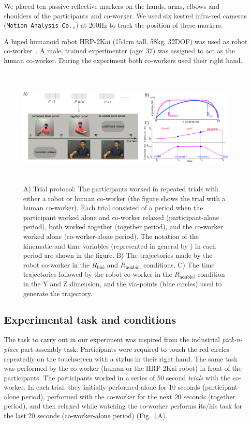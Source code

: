 We placed ten passive reflective markers on the hands, arms, elbows and shoulders of the participants and co-worker. We used six kestrel infra-red cameras (\texttt{Motion Analysis Co.,}) at 200Hz to track the position of these markers.

A biped humanoid robot HRP-2Kai (154cm tall, 58kg, 32DOF) was used as robot co-worker~\cite{Kaneko:RAS_ICHR:2015}. A male, trained experimenter (age: 37) was assigned to act as the human co-worker. During the experiment both co-workers used their right hand.


\begin{figure}[phtb]
	\includegraphics[width=\textwidth,height=6cm]{plots/c2-plots/trialprotocol}
	\caption{A) Trial protocol: The participants worked in repeated trials with either a robot or human co-worker (the figure shows the trial with a human co-worker). Each trial consisted of a period when the participant worked alone and co-worker relaxed (participant-alone period), both worked together (together period), and the co-worker worked alone (co-worker-alone period). The notation of the kinematic and time variables (represented in general by \boldmath{$\eta$}) in each period are shown in the figure. B) The trajectories made by the robot co-worker in the $\textit{R}_{\text{biol}}$ and $\textit{R}_{\text{nonbiol}}$ conditions. C) The time trajectories followed by the robot co-worker in the $\textit{R}_{\text{nonbiol}}$ condition in the Y and Z dimension, and the via-points (blue circles) used to generate the trajectory.}
	\label{fig:trial}
\end{figure}

\subsection{Experimental task and conditions}

The task to carry out in our experiment was inspired from the industrial \textit{pick-n-place} part-assembly task. Participants were required to touch the red circles repeatedly on the touchscreen with a stylus in their right hand. The same task was performed by the co-worker (human or the HRP-2Kai robot) in front of the participants. The participants worked in a series of 50 second \textit{trials} with the co-worker. In each trial, they initially performed alone for 10 seconds (participant-alone period), performed with the co-worker for the next 20 seconds (together period), and then relaxed while watching the co-worker performs its/his task for the last 20 seconds (co-worker-alone period) (Fig.~\ref{fig:trial}A).

